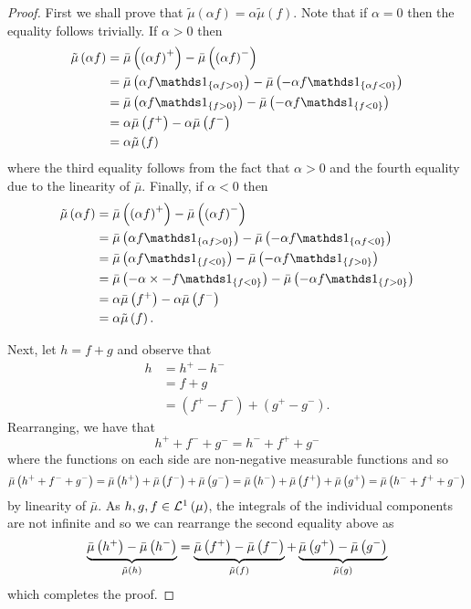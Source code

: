 \begin{proof}
First we shall prove that $\tilde{\mu}\left(\alpha f\right)=\alpha\tilde{\mu}\left(f\right).$
Note that if $\alpha=0$ then the equality follows trivially. If $\alpha>0$
then 
\begin{align*}
\tilde{\mu}\left(\alpha f\right) & =\lebInt{\mu}{\left(\alpha f\right)^{+}}-\lebInt{\mu}{\left(\alpha f\right)^{-}}\\
 & =\lebInt{\mu}{\alpha f\indicate_{\left\{ \alpha f>0\right\} }}-\lebInt{\mu}{-\alpha f\indicate_{\left\{ \alpha f<0\right\} }}\\
 & =\lebInt{\mu}{\alpha f\indicate_{\left\{ f>0\right\} }}-\lebInt{\mu}{-\alpha f\indicate_{\left\{ f<0\right\} }}\\
 & =\alpha\lebInt{\mu}{f^{+}}-\alpha\lebInt{\mu}{f^{-}}\\
 & =\alpha\tilde{\mu}\left(f\right)
\end{align*}
where the third equality follows from the fact that $\alpha>0$ and
the fourth equality due to the linearity of $\bar{\mu}.$ Finally,
if $\alpha<0$ then
\begin{align*}
\tilde{\mu}\left(\alpha f\right) & =\lebInt{\mu}{\left(\alpha f\right)^{+}}-\lebInt{\mu}{\left(\alpha f\right)^{-}}\\
 & =\lebInt{\mu}{\alpha f\indicate_{\left\{ \alpha f>0\right\} }}-\lebInt{\mu}{-\alpha f\indicate_{\left\{ \alpha f<0\right\} }}\\
 & =\lebInt{\mu}{\alpha f\indicate_{\left\{ f<0\right\} }}-\lebInt{\mu}{-\alpha f\indicate_{\left\{ f>0\right\} }}\\
 & =\lebInt{\mu}{-\alpha\times-f\indicate_{\left\{ f<0\right\} }}-\lebInt{\mu}{-\alpha f\indicate_{\left\{ f>0\right\} }}\\
 & =\alpha\bar{\mu}\left(f^{+}\right)-\alpha\lebInt{\mu}{f^{-}}\\
 & =\alpha\tilde{\mu}\left(f\right).
\end{align*}

Next, let $h=f+g$ and observe that
\begin{align*}
h & =h^{+}-h^{-}\\
 & =f+g\\
 & =\left(f^{+}-f^{-}\right)+\left(g^{+}-g^{-}\right).
\end{align*}
Rearranging, we have that 
\[
h^{+}+f^{-}+g^{-}=h^{-}+f^{+}+g^{-}
\]
where the functions on each side are non-negative measurable functions
and so
\[
\bar{\mu}\left(h^{+}+f^{-}+g^{-}\right)=\bar{\mu}\left(h^{+}\right)+\bar{\mu}\left(f^{-}\right)+\bar{\mu}\left(g^{-}\right)=\bar{\mu}\left(h^{-}\right)+\bar{\mu}\left(f^{+}\right)+\bar{\mu}\left(g^{+}\right)=\bar{\mu}\left(h^{-}+f^{+}+g^{-}\right)
\]
by linearity of $\bar{\mu}.$ As $h,g,f\in\mathcal{L}^{1}\left(\mu\right)$, the integrals
of the individual components are not infinite and so we can rearrange
the second equality above as
\[
\underbrace{\bar{\mu}\left(h^{+}\right)-\bar{\mu}\left(h^{-}\right)}_{\tilde{\mu}\left(h\right)}=\underbrace{\bar{\mu}\left(f^{+}\right)-\bar{\mu}\left(f^{-}\right)}_{\tilde{\mu}\left(f\right)}+\underbrace{\bar{\mu}\left(g^{+}\right)-\bar{\mu}\left(g^{-}\right)}_{\tilde{\mu}\left(g\right)}
\]
which completes the proof.
\end{proof}
